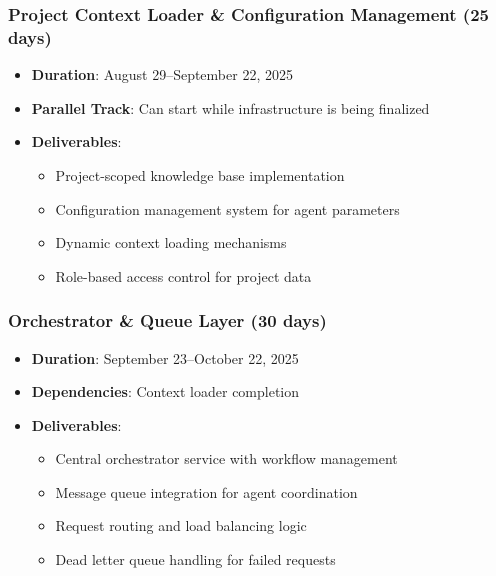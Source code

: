 \documentclass[12pt]{report}
\begin{document}
\subsubsection{Project Context Loader \& Configuration Management (25 days)}
\begin{itemize}
  \item \textbf{Duration}: August 29--September 22, 2025
  \item \textbf{Parallel Track}: Can start while infrastructure is being finalized
  \item \textbf{Deliverables}:
    \begin{itemize}
      \item Project-scoped knowledge base implementation
      \item Configuration management system for agent parameters
      \item Dynamic context loading mechanisms
      \item Role-based access control for project data
    \end{itemize}
\end{itemize}

\subsubsection{Orchestrator \& Queue Layer (30 days)}
\begin{itemize}
  \item \textbf{Duration}: September 23--October 22, 2025
  \item \textbf{Dependencies}: Context loader completion
  \item \textbf{Deliverables}:
    \begin{itemize}
      \item Central orchestrator service with workflow management
      \item Message queue integration for agent coordination
      \item Request routing and load balancing logic
      \item Dead letter queue handling for failed requests
    \end{itemize}
\end{itemize}
\end{document}

